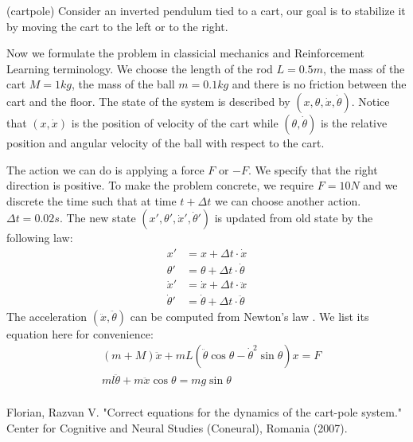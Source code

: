 \documentclass{article}
\begin{document}
(cartpole) Consider an inverted pendulum tied to a cart, our goal is to stabilize it by moving the cart
to the left or to the right.

Now we formulate the problem in classicial mechanics and Reinforcement Learning terminology.
We choose the length of the rod $L = 0.5 m$, the mass of the cart $M=1 kg$, the mass of the ball $m=0.1 kg$
and there is no friction between the cart and the floor.
The state of the system is described by
$(x, \theta, \dot{x}, \dot{\theta})$. Notice that $(x, \dot{x})$ is the position of velocity of the cart while
$(\theta, \dot{\theta})$ is the relative position and angular velocity of the ball with respect to the cart.

The action we can do is applying a force
$F$ or $-F$. We specify that the right direction is positive. To make the problem concrete,
we require $F=10N$ and we discrete the time such that at time $t+\Delta t$ we can choose another action.
$\Delta t = 0.02s$. The new state $(x', \theta', \dot{x}', \dot{\theta}')$ is updated from old state by the following law:
\begin{align*}
x' &= x + \Delta t \cdot \dot{x} \\
\theta' &= \theta + \Delta t \cdot \dot{\theta} \\
\dot{x}' &= \dot{x} + \Delta t \cdot \ddot{x} \\
\dot{\theta}' &= \dot{\theta} + \Delta t \cdot \ddot{\theta}
\end{align*}
The acceleration $(\ddot{x}, \ddot{\theta})$ can be computed from Newton's law \cite{cartpole}.
We list its equation here for convenience:
\begin{align*}
& (m + M)\ddot{x} + mL(\ddot{\theta} \cos \theta - \dot{\theta}^2 \sin \theta) x= F \\
& m l \ddot{\theta} + m \ddot{x} \cos\theta = m g \sin \theta \\
\end{align*}

\begin{thebibliography}{9}
	 Florian, Razvan V. "Correct equations for the dynamics of the cart-pole system." Center for Cognitive and Neural Studies (Coneural), Romania (2007).
\end{thebibliography}
\end{document}
